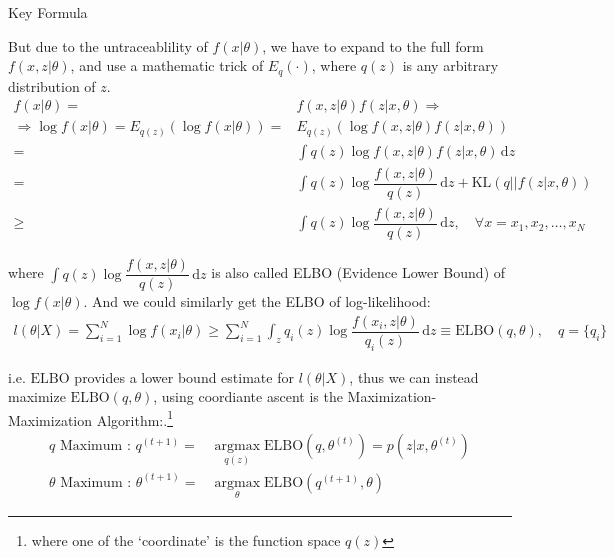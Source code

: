 \begin{point}
    Key Formula
\end{point}

    But due to the untraceablility of $ f(x|\theta ) $, we have to expand to the full form $ f(x,z|\theta) $, and use a mathematic trick of $ E_q(\cdot) $, where $ q(z) $ is any arbitrary distribution of $ z $. 
\begin{align}
    f(x|\theta )=&f(x,z|\theta )f(z|x,\theta )\Rightarrow \\
    \Rightarrow \log f(x|\theta )=E_{q(z)}\left(\log f(x|\theta )\right)=&E_{q(z)}\left(\log f(x,z|\theta )f(z|x,\theta )\right)\\
    =&\int q(z)\log f(x,z|\theta )f(z|x,\theta ) \,\mathrm{d}z\\
    =&\int q(z)\log \dfrac{f(x,z|\theta )}{q(z)} \,\mathrm{d}z +\mathrm{KL}\left(q||f(z|x,\theta )\right) \\
    \geq&\int q(z) \log \dfrac{f(x,z|\theta )}{q(z)}\,\mathrm{d}z ,\quad \forall x=x_1,x_2,\ldots,x_N
\end{align}

    where $ \displaystyle\int q(z)\log \dfrac{f(x,z|\theta )}{q(z)} \,\mathrm{d}z  $ is also called ELBO (Evidence Lower Bound) of $ \log f(x|\theta ) $. And we could similarly get the ELBO of log-likelihood:
    \begin{align}
        l(\theta |X)=\sum_{i=1}^N\log f(x_i|\theta )\geq \sum_{i=1}^N\int_z q_i(z)\log\dfrac{f(x_i,z|\theta )}{q_i(z)} \,\mathrm{d}z\equiv \mathrm{ELBO}(q,\theta ),\quad q=\{q_i\}
    \end{align}
    
    i.e. $ \mathrm{ELBO}  $ provides a lower bound estimate for $ l(\theta |X) $, thus we can instead maximize $ \mathrm{ELBO}(q,\theta)  $, using coordiante ascent is the Maximization-Maximization Algorithm:.\footnote{where one of the `coordinate' is the function space $ q(z) $}
\begin{align}
        q\text{ Maximum : }q^{(t+1)}=&\mathop{\arg\max}\limits_{q(z)}\mathrm{ELBO}(q,\theta ^{(t)})=p(z|x,\theta ^{(t)})\\
        \theta \text{ Maximum : }\theta ^{(t+1)}=&\mathop{\arg\max}\limits_{\theta }\mathrm{ELBO} (q^{(t+1)},\theta ) 
\end{align}

